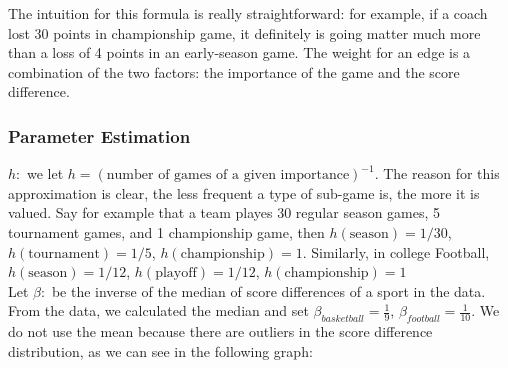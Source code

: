 \documentclass[titlepage,11pt]{article}
\begin{document}
\noindent The intuition for this formula is really straightforward: for example, if a coach lost 30 points in championship game, it definitely is going matter much more than a loss of 4 points in an early-season game. The weight for an edge is a combination of the two factors: the importance of the game and the score difference.

\subsubsection*{Parameter Estimation}
\noindent $h:$ we let $h = (\text{number of games of a given importance})^{-1}$. The reason for this approximation is clear, the less frequent a type of sub-game is, the more it is valued. Say for example that a team  playes 30 regular season games, 5 tournament games, and 1 championship game, then $h(\mbox{season}) = 1/30$, $h(\mbox{tournament}) = 1/5$, $h(\mbox{championship}) = 1$. Similarly, in college Football, $h(\mbox{season}) = 1/12$, $h(\mbox{playoff}) = 1/12$, $h(\mbox{championship}) = 1$
\\

\noindent Let $\beta:$ be the inverse of the median of score differences of a sport in the data. From the data, we calculated the median and set $\beta_{basketball} = \frac{1}{9}$, $\beta_{football} = \frac{1}{10}$. We do not use the mean because there are outliers in the score difference distribution, as we can see in the following graph:
\\
\end{document}
